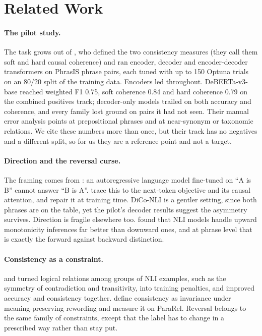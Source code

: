 \section{Related Work}
\label{sec:related}

\paragraph{The pilot study.}
The task grows out of \citet{apaolaza-larraya-etal-2026-assessing}, who defined the two consistency measures (they call them soft and hard causal coherence) and ran encoder, decoder and encoder-decoder transformers on PhrasIS phrase pairs, each tuned with up to 150 Optuna trials on an 80/20 split of the training data. Encoders led throughout. DeBERTa-v3-base reached weighted F1 0.75, soft coherence 0.84 and hard coherence 0.79 on the combined positives track; decoder-only models trailed on both accuracy and coherence, and every family lost ground on pairs it had not seen. Their manual error analysis points at prepositional phrases and at near-synonym or taxonomic relations. We cite these numbers more than once, but their track has no negatives and a different split, so for us they are a reference point and not a target.

\paragraph{Direction and the reversal curse.}
The framing comes from \citet{berglund-etal-2024-reversal}: an autoregressive language model fine-tuned on ``A is B'' cannot answer ``B is A''. \citet{lv-etal-2024-analysis} trace this to the next-token objective and its causal attention, and repair it at training time. DiCo-NLI is a gentler setting, since both phrases are on the table, yet the pilot's decoder results suggest the asymmetry survives. Direction is fragile elsewhere too. \citet{yanaka-etal-2019-help} found that NLI models handle upward monotonicity inferences far better than downward ones, and at phrase level that is exactly the forward against backward distinction.

\paragraph{Consistency as a constraint.}
\citet{minervini-riedel-2018-adversarially} and \citet{li-etal-2019-logic} turned logical relations among groups of NLI examples, such as the symmetry of contradiction and transitivity, into training penalties, and improved accuracy and consistency together. \citet{elazar-etal-2021-measuring} define consistency as invariance under meaning-preserving rewording and measure it on ParaRel. Reversal belongs to the same family of constraints, except that the label has to change in a prescribed way rather than stay put.

